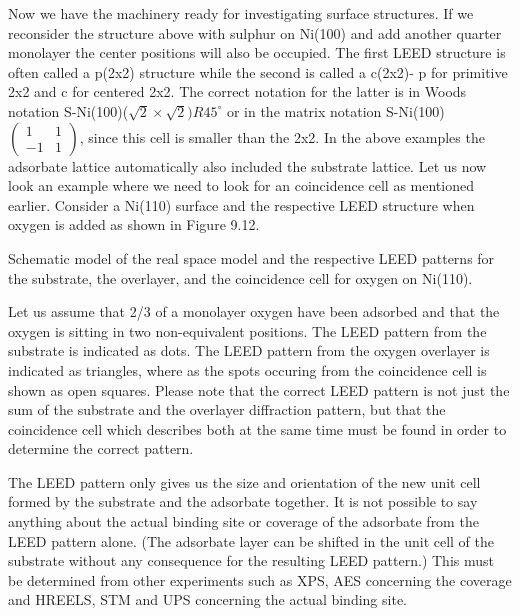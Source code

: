 Now we have the machinery ready for investigating surface structures. If we reconsider the structure above with sulphur on Ni(100) and add another quarter monolayer the center positions will also be occupied. The first LEED structure is often called a p(2x2) structure while the second is called a c(2x2)- p for primitive 2x2 and c for centered 2x2. The correct notation for the latter is in Woods notation S-Ni(100)($\sqrt{2} \times \sqrt{2})R45^{\circ}$ or in the matrix notation S-Ni(100) $\begin{pmatrix} 1 & 1\\ -1 & 1\end{pmatrix}$, since this cell is smaller than the 2x2. In the above examples the adsorbate lattice automatically also included the substrate lattice. Let us now look an example where we need to look for an coincidence cell as mentioned earlier. Consider a Ni(110) surface and the respective LEED structure when oxygen is added as shown in Figure 9.12.

\vspace*{11cm}

 Schematic model of the real space model and the respective LEED patterns for the substrate, the overlayer, and the coincidence cell for oxygen on Ni(110).

\vspace{1cm}


Let us assume that 2/3 of a monolayer oxygen have been adsorbed and that the oxygen is sitting in two non-equivalent positions. The LEED pattern from the substrate is indicated as dots. The LEED pattern from the oxygen overlayer is indicated as triangles, where as the spots occuring from the coincidence cell is shown as open squares. Please note that the correct LEED pattern is not just the sum of the substrate and the overlayer diffraction pattern, but that the coincidence cell which describes both at the same time must be found in order to determine the correct pattern.


The LEED pattern only gives us the size and orientation of the new unit cell  formed by the substrate and the adsorbate together. It is not possible to say anything about the actual binding site or coverage of the adsorbate from the LEED pattern alone. (The adsorbate layer can be shifted in the unit cell of the substrate without any consequence for the resulting LEED pattern.) This must be determined from other experiments such as XPS, AES concerning the coverage and HREELS, STM and UPS concerning the actual binding site.

